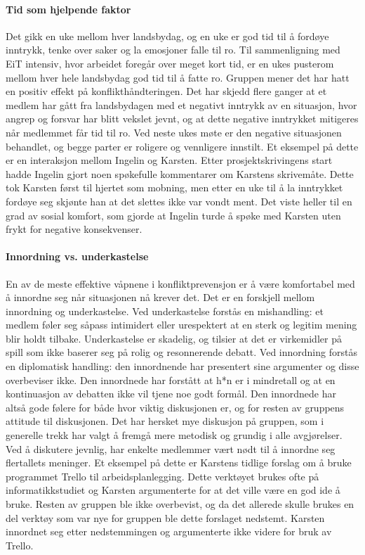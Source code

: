 \paragraph{Tid som hjelpende faktor}
Det gikk en uke mellom hver landsbydag, og en uke er god tid til å fordøye inntrykk, tenke over saker og la emosjoner falle til ro. 
Til sammenligning med EiT intensiv, hvor arbeidet foregår over meget kort tid, er en ukes pusterom mellom hver hele landsbydag god tid til å fatte ro.
Gruppen mener det har hatt en positiv effekt på konflikthåndteringen. 
Det har skjedd flere ganger at et medlem har gått fra landsbydagen med et negativt inntrykk av en situasjon, hvor angrep og forsvar har blitt vekslet jevnt, og at dette negative inntrykket mitigeres når medlemmet får tid til ro.
Ved neste ukes møte er den negative situasjonen behandlet, og begge parter er roligere og vennligere innstilt.
Et eksempel på dette er en interaksjon mellom Ingelin og Karsten.
Etter prosjektskrivingens start hadde Ingelin gjort noen spøkefulle kommentarer om Karstens skrivemåte.
Dette tok Karsten først til hjertet som mobning, men etter en uke til å la inntrykket fordøye seg skjønte han at det slettes ikke var vondt ment.
Det viste heller til en grad av sosial komfort, som gjorde at Ingelin turde å spøke med Karsten uten frykt for negative konsekvenser. 
\\
\paragraph{Innordning vs. underkastelse}
En av de meste effektive våpnene i konfliktprevensjon er å være komfortabel med å innordne seg når situasjonen nå krever det. 
Det er en forskjell mellom innordning og underkastelse. 
Ved underkastelse forstås en mishandling: et medlem føler seg såpass intimidert eller urespektert at en sterk og legitim mening blir holdt tilbake. 
Underkastelse er skadelig, og tilsier at det er virkemidler på spill som ikke baserer seg på rolig og resonnerende debatt.
Ved innordning forstås en diplomatisk handling: den innordnende har presentert sine argumenter og disse overbeviser ikke.
Den innordnede har forstått at h*n er i mindretall og at en kontinuasjon av debatten ikke vil tjene noe godt formål.
Den innordnede har altså gode følere for både hvor viktig diskusjonen er, og for resten av gruppens attitude til diskusjonen.
Det har hersket mye diskusjon på gruppen, som i generelle trekk har valgt å fremgå mere metodisk og grundig i alle avgjørelser.
Ved å diskutere jevnlig, har enkelte medlemmer vært nødt til å innordne seg flertallets meninger. 
Et eksempel på dette er Karstens tidlige forslag om å bruke programmet Trello til arbeidsplanlegging. 
Dette verktøyet brukes ofte på informatikkstudiet og Karsten argumenterte for at det ville være en god ide å bruke. 
Resten av gruppen ble ikke overbevist, og da det allerede skulle brukes en del verktøy som var nye for gruppen ble dette forslaget nedstemt. 
Karsten innordnet seg etter nedstemmingen og argumenterte ikke videre for bruk av Trello. 
\\
